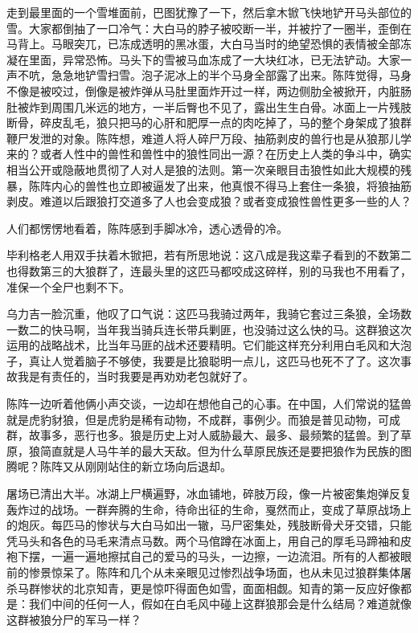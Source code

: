 \par 走到最里面的一个雪堆面前，巴图犹豫了一下，然后拿木锨飞快地铲开马头部位的雪。大家都倒抽了一口冷气：大白马的脖子被咬断一半，并被拧了一圈半，歪倒在马背上。马眼突兀，已冻成透明的黑冰蛋，大白马当时的绝望恐惧的表情被全部冻凝在里面，异常恐怖。马头下的雪被马血冻成了一大块红冰，已无法铲动。大家一声不吭，急急地铲雪扫雪。泡子泥冰上的半个马身全部露了出来。陈阵觉得，马身不像是被咬过，倒像是被炸弹从马肚里面炸开过一样，两边侧肋全被掀开，内脏肠肚被炸到周围几米远的地方，一半后臀也不见了，露出生生白骨。冰面上一片残肢断骨，碎皮乱毛，狼只把马的心肝和肥厚一点的肉吃掉了，马的整个身架成了狼群鞭尸发泄的对象。陈阵想，难道人将人碎尸万段、抽筋剥皮的兽行也是从狼那儿学来的？或者人性中的兽性和兽性中的狼性同出一源？在历史上人类的争斗中，确实相当公开或隐蔽地贯彻了人对人是狼的法则。第一次亲眼目击狼性如此大规模的残暴，陈阵内心的兽性也立即被逼发了出来，他真恨不得马上套住一条狼，将狼抽筋剥皮。难道以后跟狼打交道多了人也会变成狼？或者变成狼性兽性更多一些的人？
\par 人们都愣愣地看着，陈阵感到手脚冰冷，透心透骨的冷。
\par 毕利格老人用双手扶着木锨把，若有所思地说：这八成是我这辈子看到的不数第二也得数第三的大狼群了，连最头里的这匹马都咬成这碎样，别的马我也不用看了，准保一个全尸也剩不下。
\par 乌力吉一脸沉重，他叹了口气说：这匹马我骑过两年，我骑它套过三条狼，全场数一数二的快马啊，当年我当骑兵连长带兵剿匪，也没骑过这么快的马。这群狼这次运用的战略战术，比当年马匪的战术还要精明。它们能这样充分利用白毛风和大泡子，真让人觉着脑子不够使，我要是比狼聪明一点儿，这匹马也死不了了。这次事故我是有责任的，当时我要是再劝劝老包就好了。
\par 陈阵一边听着他俩小声交谈，一边却在想他自己的心事。在中国，人们常说的猛兽就是虎豹豺狼，但是虎豹是稀有动物，不成群，事例少。而狼是普见动物，可成群，故事多，恶行也多。狼是历史上对人威胁最大、最多、最频繁的猛兽。到了草原，狼简直就是人马牛羊的最大天敌。但为什么草原民族还是要把狼作为民族的图腾呢？陈阵又从刚刚站住的新立场向后退却。
\par 屠场已清出大半。冰湖上尸横遍野，冰血铺地，碎肢万段，像一片被密集炮弹反复轰炸过的战场。一群奔腾的生命，待命出征的生命，戛然而止，变成了草原战场上的炮灰。每匹马的惨状与大白马如出一辙，马尸密集处，残肢断骨犬牙交错，只能凭马头和各色的马毛来清点马数。两个马倌蹲在冰面上，用自己的厚毛马蹄袖和皮袍下摆，一遍一遍地擦拭自己的爱马的马头，一边擦，一边流泪。所有的人都被眼前的惨景惊呆了。陈阵和几个从未亲眼见过惨烈战争场面，也从未见过狼群集体屠杀马群惨状的北京知青，更是惊吓得面色如雪，面面相觑。知青的第一反应好像都是：我们中间的任何一人，假如在白毛风中碰上这群狼那会是什么结局？难道就像这群被狼分尸的军马一样？
